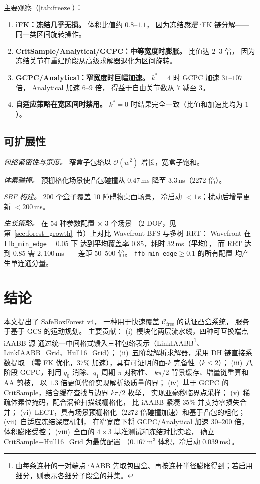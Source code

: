\documentclass[journal]{IEEEtran}
\newcommand{\Cfree}{\mathcal{C}_\text{free}}
\newcommand{\calO}{\mathcal{O}}
\newcommand{\LinkIAABBDef}{由每条连杆的一对端点 iAABB 先取包围盒、再按连杆半径膨胀得到；若启用细分，则表示各细分子段盒的并集。}
\begin{document}
主要观察（\cref{tab:freeze}）：
\begin{enumerate}
  \item \textbf{iFK：冻结几乎无损。}
    体积比值约 $0.8$--$1.1$，
    因为冻结\emph{就是} iFK 链分解——同一类区间旋转操作。
  \item \textbf{CritSample/Analytical/GCPC：中等宽度时膨胀。}
    比值达 $2$--$3$ 倍，
    因为冻结关节在重建阶段从高级求解器退化为区间旋转。
  \item \textbf{GCPC/Analytical：窄宽度时巨幅加速。}
    $k^*{=}4$ 时 GCPC 加速 $31$--$107$ 倍，
    Analytical 加速 $6$--$9$ 倍，
    得益于自由关节数从 $7$ 减至 $3$。
  \item \textbf{自适应策略在宽区间时禁用。}
    $k^*{=}0$ 时结果完全一致（比值和加速比均为 $1$）。
\end{enumerate}

\subsection{可扩展性}\label{sec:exp_scalability}

\emph{包络紧密性与宽度。}
窄盒子包络以 $\calO(w^2)$ 增长，宽盒子饱和。

\emph{体素碰撞。}
预栅格化场景使凸包碰撞从 0.47\,ms
降至 3.3\,ns（$2272$ 倍）。

\emph{SBF 构建。}
200 个盒子覆盖 10 障碍物桌面场景，
冷启动 $<\!1$\,s；扰动后增量更新 $<\!200$\,ms。

\emph{生长策略。}
在 $54$ 种参数配置 $\times$ $3$ 个场景
（2-DOF，见第~\ref{sec:forest_growth}~节）上对比
Wavefront BFS 与多树 RRT：
Wavefront 在 \texttt{ffb\_min\_edge}${}=0.05$ 下
达到平均覆盖率 $0.85$，耗时 $32$\,ms（平均），
而 RRT 达到 $0.85$ 需 $2{,}100$\,ms——差距 $50$--$500$ 倍。
\texttt{ffb\_min\_edge}${} \geq 0.1$ 的所有配置
均产生单连通分量。

\section{结论}\label{sec:conclusion}

本文提出了 SafeBoxForest v4，
一种用于快速覆盖 $\Cfree$ 的认证凸盒系统，
服务于基于 GCS 的运动规划。
主要贡献：
(i)~模块化两层流水线，四种可互换端点 iAABB 源
通过统一中间格式馈入三种包络表示（LinkIAABB\footnote{\LinkIAABBDef}、LinkIAABB\_Grid、Hull16\_Grid）；
(ii)~五阶段解析求解器，采用 DH 链直接系数提取
（零 FK 优化，$37\%$ 加速），具有可证明的面-$k$ 完备性（$k \leq 2$）；
(iii)~八阶段 GCPC，利用 $q_0$ 消除、$q_1$ 周期-$\pi$ 对称性、
$k\pi/2$ 背景缓存、增量链重算和 AA 剪枝，
以 $1.3$ 倍更低代价实现解析级质量的界；
(iv)~基于 GCPC 的 CritSample，结合缓存查找与边界 $k\pi/2$ 枚举，
实现亚毫秒临界点采样；
(v)~稀疏体素位掩码，配合涡轮扫描线栅格化，
比 iAABB 紧凑 $35\%$ 并支持零损失合并；
(vi)~LECT，具有场景预栅格化（$2272$ 倍碰撞加速）和基于凸包的粗化；
(vii)~自适应冻结深度机制，
在窄宽度下将 GCPC/Analytical 加速 $30$--$200$ 倍，
体积膨胀受控；
(viii)~全面的 $4{\times}3$ 基准测试和冻结对比实验，
确立 CritSample+Hull16\_Grid 为最优配置
（$0.167$\,m$^3$ 体积，冷启动 $0.039$\,ms）。
\end{document}
